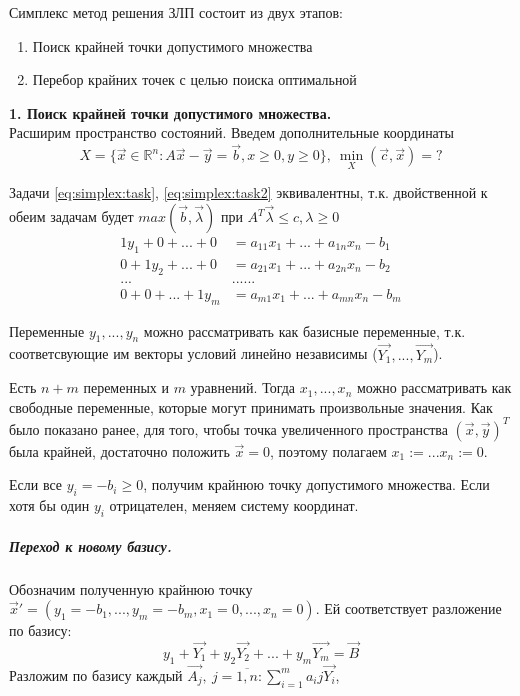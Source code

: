 \documentclass[a4paper, 14pt]{extarticle}
\numberwithin{equation}{section}
\begin{document}
Симплекс метод решения ЗЛП состоит из двух этапов:
\begin{enumerate}
    \item Поиск крайней точки допустимого множества
    \item Перебор крайних точек с целью поиска оптимальной
\end{enumerate}


\textbf{1. Поиск крайней точки допустимого множества.}\\
Расширим пространство состояний. Введем дополнительные координаты
\begin{equation}
    \label{eq:simplex:task2}
X = \{ \vec{x} \in \mathbb{R}^n: A \vec{x} - \vec{y} = \vec{b}, x \ge 0, y \ge 0 \}, \ \min_X ( \vec{c}, \vec{x}) = ? 
\end{equation}

Задачи \ref{eq:simplex:task}, \ref{eq:simplex:task2} эквивалентны, т.к. двойственной к обеим задачам будет $ max( \vec{b}, \vec{\lambda} ) $ при $ A^T \vec{\lambda} \le c, \lambda \ge 0 $
\begin{align*}
    1y_1 + 0 + ... + 0 &= a_{11}x_1 + ... + a_{1n}x_n-b_1 \\
    0 + 1y_2 + ... + 0 &= a_{21}x_1 + ... + a_{2n}x_n-b_2 \\
    ... &... ...\\
    0 + 0 + ... + 1y_m &= a_{m1}x_1 + ... + a_{mn}x_n-b_m
\end{align*}

Переменные $y_1,...,y_n$ можно рассматривать как базисные переменные, т.к. соответсвующие им векторы условий линейно независимы ($ \vec{Y_1},..., \vec{Y_m} $).

Есть $n+m$ переменных и $m$ уравнений. Тогда $x_1,...,x_n$ можно рассматривать как свободные переменные, которые могут принимать произвольные значения. Как было показано ранее, для того, чтобы точка увеличенного пространства $ (\vec{x}, \vec{y})^T $ была крайней, достаточно положить $\vec{x}=0$, поэтому полагаем $ x_1 := ... x_n := 0 $. 

Если все $y_i = -b_i \ge 0$, получим крайнюю точку допустимого множества. Если хотя бы один $y_i$ отрицателен, меняем систему координат.

\subparagraph{Переход к новому базису. } Обозначим полученную крайнюю точку
$\vec{x}' = (y_1 = -b_1, ..., y_m=-b_m, x_1=0,...,x_n=0)$. Ей соответствует разложение по базису:
\begin{equation}
    \label{eq:simplex:basis}
    y_1 + \vec{Y_1} + y_2 \vec{Y_2} + ... + y_m \vec{Y_m} = \vec{B}
\end{equation}
Разложим по базису каждый $\vec{A_j}, \ j= \overline{1,n}: \sum\limits^{m}_{i=1} a_ij \vec{Y_i} $,
\end{document}
